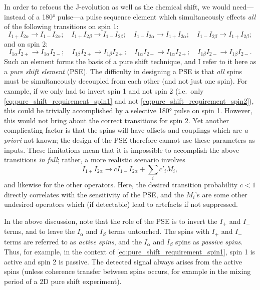 In order to refocus the J-evolution as well as the chemical shift, we would need---instead of a \ang{180} pulse---a pulse sequence element which simultaneously effects \textit{all} of the following transitions on spin 1:
\begin{equation}
    \label{eq:pure_shift_requirement_spin1}
    I_{1+}I_{2\alpha} \longrightarrow I_{1-}I_{2\alpha}; \quad I_{1+}I_{2\beta} \longrightarrow I_{1-}I_{2\beta}; \quad
    I_{1-}I_{2\alpha} \longrightarrow I_{1+}I_{2\alpha}; \quad I_{1-}I_{2\beta} \longrightarrow I_{1+}I_{2\beta};
\end{equation}
and on spin 2:
\begin{equation}
    \label{eq:pure_shift_requirement_spin2}
    I_{1\alpha}I_{2+} \longrightarrow I_{1\alpha}I_{2-}; \quad I_{1\beta}I_{2+} \longrightarrow I_{1\beta}I_{2+}; \quad
    I_{1\alpha}I_{2-} \longrightarrow I_{1\alpha}I_{2+}; \quad I_{1\beta}I_{2-} \longrightarrow I_{1\beta}I_{2-}.
\end{equation}
Such an element forms the basis of a pure shift technique, and I refer to it here as a \textit{pure shift element} (PSE).
The difficulty in designing a PSE is that \textit{all} spins must be simultaneously decoupled from each other (and not just one spin).
For example, if we only had to invert spin 1 and not spin 2 (i.e.\ only \cref{eq:pure_shift_requirement_spin1} and not \cref{eq:pure_shift_requirement_spin2}), this could be trivially accomplished by a selective \ang{180} pulse on spin 1.
However, this would not bring about the correct transitions for spin 2.
Yet another complicating factor is that the spins will have offsets and couplings which are \textit{a priori} not known; the design of the PSE therefore cannot use these parameters as inputs.
These limitations mean that it is impossible to accomplish the above transitions \textit{in full}; rather, a more realistic scenario involves
\begin{equation}
    \label{eq:realistic_pse}
    I_{1+}I_{2\alpha} \longrightarrow c I_{1-}I_{2\alpha} + \sum_i c'_i M_i,
\end{equation}
and likewise for the other operators.
Here, the desired transition probability $c < 1$ directly correlates with the sensitivity of the PSE, and the $M_i$'s are some other undesired operators which (if detectable) lead to artefacts if not suppressed.

In the above discussion, note that the role of the PSE is to invert the $I_+$ and $I_-$ terms, and to leave the $I_\alpha$ and $I_\beta$ terms untouched.
The spins with $I_+$ and $I_-$ terms are referred to as \textit{active spins}, and the $I_\alpha$ and $I_\beta$ spins as \textit{passive spins}.
Thus, for example, in the context of \cref{eq:pure_shift_requirement_spin1}, spin 1 is active and spin 2 is passive.
The detected signal always arises from the active spins (unless coherence transfer between spins occurs, for example in the mixing period of a 2D pure shift experiment).

